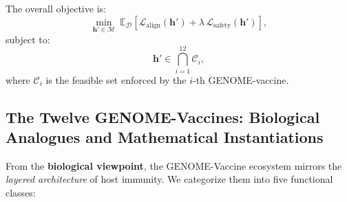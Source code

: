 The overall objective is:
\[
\min_{\mathbf{h}' \in \mathcal{M}} \ \mathbb{E}_{\mathcal{D}}\left[ \mathcal{L}_\mathrm{align}(\mathbf{h}') + \lambda \, \mathcal{L}_\mathrm{safety}(\mathbf{h}') \right],
\]
subject to:
\[
\mathbf{h}' \in \bigcap_{i=1}^{12} \mathcal{C}_i,
\]
where $\mathcal{C}_i$ is the feasible set enforced by the $i$-th GENOME-vaccine.


\subsection*{The Twelve GENOME-Vaccines: Biological Analogues and Mathematical Instantiations}

From the \textbf{biological viewpoint}, the GENOME-Vaccine ecosystem mirrors the \emph{layered architecture} of host immunity. We categorize them into five functional classes:

